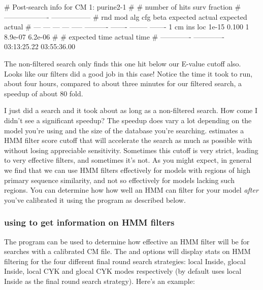 
\begin{sreoutput}
# Post-search info for CM 1: purine2-1
#
#                              number of hits       surv fraction  
#                            -------------------  -----------------
# rnd  mod  alg  cfg   beta    expected   actual  expected   actual
# ---  ---  ---  ---  -----  ----------  -------  --------  -------
    1   cm  ins  loc  1e-15       0.100        1   8.9e-07  6.2e-06
#
# expected time    actual time
# -------------  -------------
    03:13:25.22    03:55:36.00
\end{sreoutput}

The non-filtered search only finds this one hit below our E-value
cutoff also. Looks like our filters did a good job in this case!
Notice the time it took to run, about four hours, compared to about three
minutes for our filtered search, a speedup of about 80 fold. 

\begin{srefaq}{I just did a search and it took about as long as a
    non-filtered search. How come I didn't see a significant speedup?}
  The speedup does vary a lot depending on the model you're using and
  the size of the database you're searching. 
  estimates a HMM filter score cutoff that will accelerate the search
  as much as possible with without losing appreciable
  sensitivity. Sometimes this cutoff is very strict, leading to very
  effective filters, and sometimes it's not. As you might expect, in
  general we find that we can use HMM filters effectively for models
  with regions of high primary sequence similarity, and not so
  effectively for models lacking such regions. You can determine how
  how well an HMM can filter for your model \emph{after} you've
  calibrated it using the  program as described below.
\end{srefaq}


\subsubsection{using  to get information on HMM filters}

The  program can be used to determine how effective an
HMM filter will be for searches with a calibrated CM file. The
 and  options will display stats on
HMM filtering for the four different final round search strategies:
local Inside, glocal Inside, local CYK and glocal CYK modes
respectively (by default  uses local Inside as the
final round search strategy). Here's an example:

